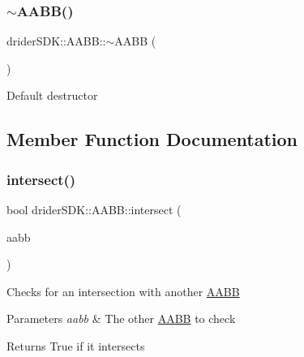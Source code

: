 \subsubsection{\texorpdfstring{$\sim$\+A\+A\+B\+B()}{~AABB()}}
{\footnotesize\ttfamily drider\+S\+D\+K\+::\+A\+A\+B\+B\+::$\sim$\+A\+A\+BB (\begin{DoxyParamCaption}{ }\end{DoxyParamCaption})}

Default destructor 

\subsection{Member Function Documentation}
\mbox{\label{classdrider_s_d_k_1_1_a_a_b_b_aad011cc0c9bafb8fee5e0590935686ab}} 
\subsubsection{\texorpdfstring{intersect()}{intersect()}\hspace{0.1cm}{\footnotesize\ttfamily [1/6]}}
{\footnotesize\ttfamily bool drider\+S\+D\+K\+::\+A\+A\+B\+B\+::intersect (\begin{DoxyParamCaption}\item[{\hyperlink{classdrider_s_d_k_1_1_a_a_b_b}{A\+A\+BB} \&}]{aabb }\end{DoxyParamCaption})}

Checks for an intersection with another \hyperlink{classdrider_s_d_k_1_1_a_a_b_b}{A\+A\+BB}


\begin{DoxyParams}{Parameters}
{\em aabb} & The other \hyperlink{classdrider_s_d_k_1_1_a_a_b_b}{A\+A\+BB} to check\\
\hline
\end{DoxyParams}
\begin{DoxyReturn}{Returns}
True if it intersects 
\end{DoxyReturn}
\mbox{\label{classdrider_s_d_k_1_1_a_a_b_b_a30da617eda34d0a0396c00cad6bb11fa}} 
